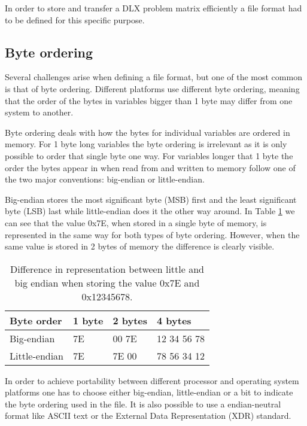 In order to store and transfer a DLX problem matrix efficiently a file format had to be defined for this specific purpose.


\subsection{Byte ordering}

Several challenges arise when defining a file format, but one of the most common is that of byte ordering.
Different platforms use different byte ordering, meaning that the order of the bytes in variables bigger than 1 byte may differ from one system to another.

Byte ordering deals with how the bytes for individual variables are ordered in memory.
For 1 byte long variables the byte ordering is irrelevant as it is only possible to order that single byte one way.
For variables longer that 1 byte the order the bytes appear in when read from and written to memory follow one of the two major conventions: big-endian or little-endian.

Big-endian stores the most significant byte (MSB) first and the least significant byte (LSB) last while little-endian does it the other way around.
In Table \ref{tab:endian} we can see that the value 0x7E, when stored in a single byte of memory, is represented in the same way for both types of byte ordering.
However, when the same value is stored in 2 bytes of memory the difference is clearly visible.


\begin{table}[htbp]
	\centering
	\begin{tabular}{|l||l|l||l|}
		\hline
		\bf Byte order & \bf 1 byte & \bf 2 bytes & \bf 4 bytes \\ \hline
		Big-endian    & 7E & 00 7E & 12 34 56 78 \\ \hline
		Little-endian & 7E & 7E 00 & 78 56 34 12 \\ \hline
	\end{tabular}
	\caption{Difference in representation between little and big endian when storing the value 0x7E and 0x12345678.}
	\label{tab:endian}
\end{table}

In order to achieve portability between different processor and operating system platforms one has to choose either big-endian, little-endian or a bit to indicate the byte ordering used in the file.
It is also possible to use a endian-neutral format like ASCII text or the External Data Representation (XDR) \cite{RFC4506} standard.

